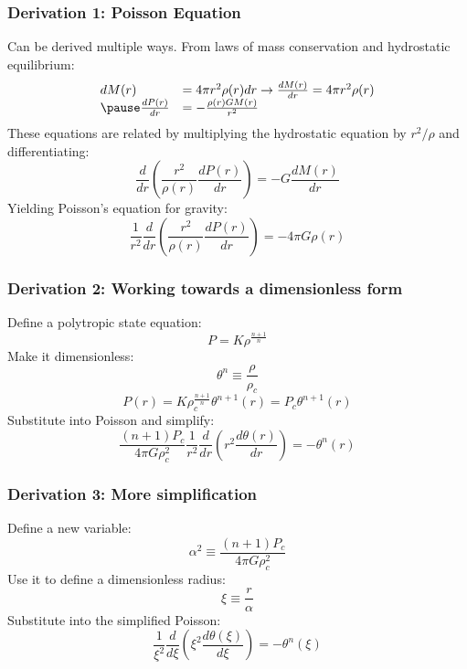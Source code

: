 \documentclass{beamer}
\begin{document}
        \begin{frame}
            \frametitle{Derivation 1: Poisson Equation}
            Can be derived multiple ways. From laws of mass conservation and
            hydrostatic equilibrium:
            \pause
            \[ \begin{array}{l l}
                dM(r) &= 4\pi r^2\rho(r)dr \rightarrow \frac{dM(r)}{dr}=4\pi r^2\rho(r) \\
                \pause
                \frac{dP(r)}{dr} &= -\frac{\rho(r)GM(r)}{r^2}
                \end{array}
            \]
            \pause
            These equations are related by multiplying the hydrostatic equation by
            \(r^2/\rho\) and differentiating:
            \pause
            \[\frac{d}{dr}\left(\frac{r^2}{\rho(r)}\frac{dP(r)}{dr}\right)=-G\frac{dM(r)}{dr}\]
            \pause
            Yielding Poisson's equation for gravity:
            \pause
            \[ \frac{1}{r^2} \frac{d}{dr} \left( \frac{r^2}{\rho(r)} \frac{dP(r)}{dr} \right) =-4 \pi G \rho(r) \]
        \end{frame}
        \begin{frame}
            \frametitle{Derivation 2: Working towards a dimensionless form}

            Define a polytropic state equation:
            \pause
            \[ P=K\rho^{\frac{n+1}{n}} \]
            \pause
            Make it dimensionless:
            \[\theta^n\equiv\frac{\rho}{\rho_c} \]
            \pause
            \[ P(r)=K\rho_c^{\frac{n+1}{n}}\theta^{n+1}(r)=P_c\theta^{n+1}(r) \]
            \pause
            Substitute into Poisson and simplify:
            \pause
            \[\frac{(n+1)P_c}{4\pi G\rho_c^2}\frac{1}{r^2}\frac{d}{dr}\left(r^2\frac{d\theta(r)}{dr}\right)=-\theta^n(r) \]

        \end{frame}

        \begin{frame}
            \frametitle{Derivation 3: More simplification}

            Define a new variable:
            \pause
            \[\alpha^2 \equiv \frac{(n+1)P_c}{4\pi G\rho_c^2}\]
            \pause
            Use it to define a dimensionless radius:
            \pause
            \[\xi \equiv \frac{r}{\alpha}\]
            \pause
            Substitute into the simplified Poisson:
            \pause
            \[\frac{1}{\xi^2}\frac{d}{d\xi}\left(\xi^2\frac{d\theta(\xi)}{d\xi}\right)=-\theta^n(\xi)\]

        \end{frame}
\end{document}
